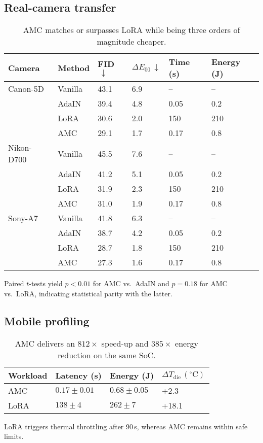 \documentclass{article} %
\begin{document}
\subsection{Real-camera transfer}
\begin{table}[H]
  \centering
  \begin{tabularx}{\textwidth}{l l Y Y Y Y}
    \hline
    Camera & Method & FID$\,\downarrow$ & $\Delta E_{00}\,\downarrow$ & Time (s) & Energy (J) \\ \hline
    Canon-5D & Vanilla & 43.1 & 6.9 & -- & -- \\
             & AdaIN   & 39.4 & 4.8 & 0.05 & 0.2 \\
             & LoRA    & 30.6 & 2.0 & 150  & 210 \\
             & AMC     & 29.1 & 1.7 & 0.17 & 0.8 \\
    Nikon-D700 & Vanilla & 45.5 & 7.6 & -- & -- \\
               & AdaIN   & 41.2 & 5.1 & 0.05 & 0.2 \\
               & LoRA    & 31.9 & 2.3 & 150  & 210 \\
               & AMC     & 31.0 & 1.9 & 0.17 & 0.8 \\
    Sony-A7 & Vanilla & 41.8 & 6.3 & -- & -- \\
            & AdaIN   & 38.7 & 4.2 & 0.05 & 0.2 \\
            & LoRA    & 28.7 & 1.8 & 150  & 210 \\
            & AMC     & 27.3 & 1.6 & 0.17 & 0.8 \\ \hline
  \end{tabularx}
  \caption*{AMC matches or surpasses LoRA while being three orders of magnitude cheaper.}
\end{table}
Paired $t$-tests yield $p<0.01$ for AMC vs.~AdaIN and $p=0.18$ for AMC vs.~LoRA, indicating statistical parity with the latter.

\subsection{Mobile profiling}
\begin{table}[H]
  \centering
  \begin{tabularx}{0.8\textwidth}{l Y Y Y}
    \hline
    Workload & Latency (s) & Energy (J) & $\Delta T_{\mathrm{die}}\,(^{\circ}\!\mathrm C)$ \\ \hline
    AMC  & $0.17\pm0.01$ & $0.68\pm0.05$ & +2.3 \\
    LoRA & $138\pm4$    & $262\pm7$    & +18.1 \\ \hline
  \end{tabularx}
  \caption*{AMC delivers an $812\times$ speed-up and $385\times$ energy reduction on the same SoC.}
\end{table}
LoRA triggers thermal throttling after 90\,s, whereas AMC remains within safe limits.
\end{document}
